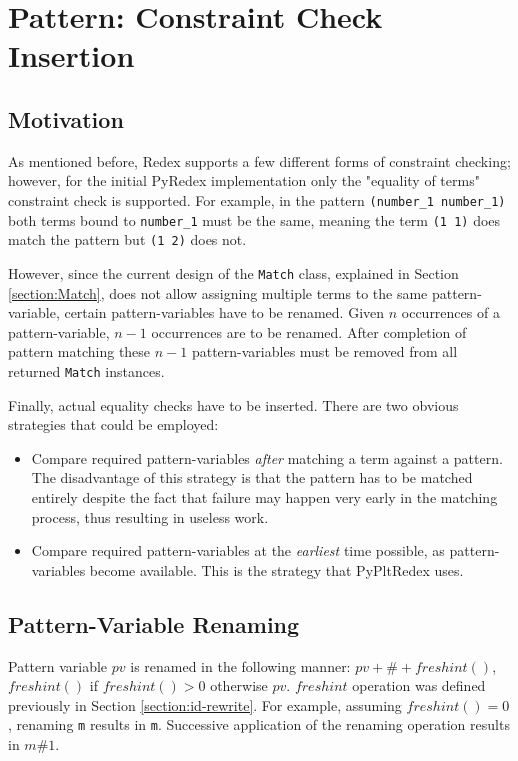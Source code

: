 \section{Pattern: Constraint Check Insertion}
\label{section:constraint-check}
\subsection{Motivation}
As mentioned before, Redex supports a few different forms of constraint checking; however, for the initial PyRedex implementation only the "equality of terms" constraint check is supported. For example, in the pattern \texttt{(number\_1 number\_1)} both terms bound to \texttt{number\_1} must be the same, meaning the term \texttt{(1 1)} does match the pattern but \texttt{(1 2)} does not.

However, since the current design of the \texttt{Match} class, explained in Section \ref{section:Match}, does not allow assigning multiple terms to the same pattern-variable, certain pattern-variables have to be renamed. Given $n$ occurrences of a pattern-variable, $n-1$ occurrences are to be renamed. After completion of pattern matching these $n-1$ pattern-variables must be removed from all returned \texttt{Match} instances.

Finally, actual equality checks have to be inserted. There are two obvious strategies that could be employed:

\begin{itemize}
\item Compare required pattern-variables \textit{after} matching a term against a pattern. The disadvantage of this strategy is that the pattern has to be matched entirely despite the fact that failure may happen very early in the matching process, thus resulting in useless work.

\item Compare required pattern-variables at the \textit{earliest} time possible, as pattern-variables become available. This is the strategy that PyPltRedex uses.
\end{itemize}

\subsection{Pattern-Variable Renaming}
Pattern variable $pv$ is renamed in the following manner: $\mathit{pv + \# + freshint()}$, $\mathit{freshint()}$ if $\mathit{freshint() > 0}$ otherwise $pv$. $\mathit{freshint}$ operation was defined previously in Section \ref{section:id-rewrite}. For example, assuming $\mathit{freshint()=0}$, renaming \texttt{m} results in \texttt{m}. Successive application of the renaming operation results in \texttt{$m\#1$}.

